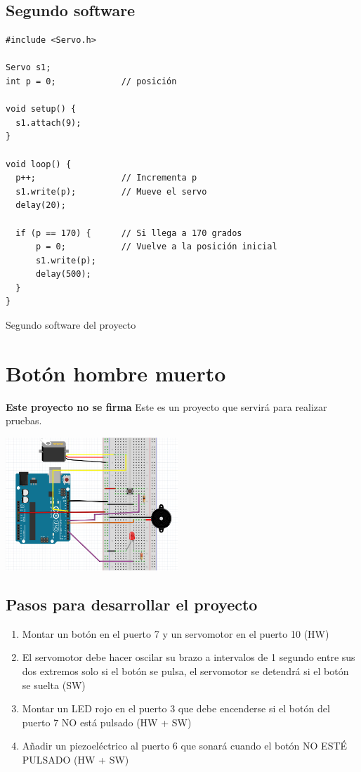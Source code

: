 \documentclass[11pt,spanish,a4paper]{article}
\begin{document}
\subsection{Segundo software}

\begin{listing}[H]
\begin{verbatim}
#include <Servo.h>

Servo s1;
int p = 0;             // posición

void setup() {
  s1.attach(9);
}

void loop() {
  p++;                 // Incrementa p
  s1.write(p);         // Mueve el servo
  delay(20);

  if (p == 170) {      // Si llega a 170 grados
      p = 0;           // Vuelve a la posición inicial
      s1.write(p);
      delay(500);
  }
}
\end{verbatim}
	\caption{Segundo software del proyecto \thesection}
\end{listing}


\newpage
\section{Botón hombre muerto}

\textbf{Este proyecto no se firma} Este es un proyecto que servirá para realizar pruebas.

\begin{center}
\includegraphics[height=5cm]{img/07.jpg}
\end{center}

\subsection{Pasos para desarrollar el proyecto}
\begin{enumerate}
	\item Montar un botón en el puerto 7 y un servomotor en el puerto 10 (HW)
	\item El servomotor debe hacer oscilar su brazo a intervalos de 1 segundo entre sus dos
		extremos solo si el botón se pulsa, el servomotor se detendrá si el botón se suelta (SW)
	\item Montar un LED rojo en el puerto 3 que debe encenderse si el botón del puerto 7 NO está
		pulsado (HW + SW)
	\item Añadir un piezoeléctrico al puerto 6 que sonará cuando el botón NO ESTÉ PULSADO (HW + SW)
\end{enumerate}
\end{document}
